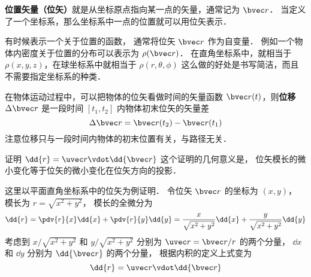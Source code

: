 
\textbf{位置矢量（位矢）}就是从坐标原点指向某一点的矢量，通常记为 $\bvec r$． 当定义了一个坐标系，那么坐标系中一点的位置就可以用位矢表示．

有时候表示一个关于位置的函数， 通常将位矢 $\bvec r$ 作为自变量． 例如一个物体内密度关于位置的分布可以表示为 $\rho(\bvec r)$． 在直角坐标系中，就相当于 $\rho(x,y,z)$，在球坐标系中就相当于 $\rho(r,\theta,\phi)$ 这么做的好处是书写简洁，而且不需要指定坐标系的种类．

在物体运动过程中，可以把物体的位矢看做时间的矢量函数 $\bvec r(t)$，则\textbf{位移} $\Delta \bvec r$ 是一段时间 $[t_1,t_2]$ 内物体初末位矢的矢量差
\begin{equation}
\Delta \bvec r = \bvec r(t_2) - \bvec r(t_1)
\end{equation}
注意位移只与一段时间内物体的初末位置有关，与路径无关．

\begin{example}{证明 $\dd{r} = \uvec r \vdot \dd{\bvec r}$}\label{Disp_ex1}
这个证明的几何意义是， 位矢模长的微小变化等于位矢的微小变化在位矢方向的投影．

这里以平面直角坐标系中的位矢为例证明． 令位矢 $\bvec r$ 的坐标为 $(x, y)$， 模长为 $r = \sqrt{x^2 + y^2}$，
模长的全微分为
\begin{equation}
\dd{r} = \pdv{r}{x} \dd{x} + \pdv{r}{y} \dd{y} = \frac{x}{\sqrt{x^2 + y^2}} \dd{x} + \frac{y}{\sqrt{x^2 + y^2}} \dd{y}
\end{equation}
考虑到 $x/\sqrt{x^2 + y^2}$ 和 $y/\sqrt{x^2 + y^2}$ 分别为 $\uvec r = \bvec r/r$ 的两个分量， $\dd{x}$ 和 $\dd{y}$ 分别为 $\dd{\bvec r}$ 的两个分量， 根据内积的定义上式变为
\begin{equation}
\dd{r} = \uvec r \vdot \dd{\bvec r}
\end{equation}
\end{example}
